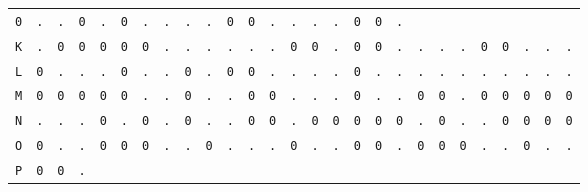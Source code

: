 \begin{figure}[H]
\begin{center}
{\begin{tabular}{c|cccccccccccccccccccccccccc}
				\texttt{0} & \texttt{.} & \texttt{.} & \texttt{0} &
				\texttt{.} & \texttt{0} & \texttt{.} & \texttt{.} &
				\texttt{.} & \texttt{.} & \texttt{0} & \texttt{0} &
				\texttt{.} & \texttt{.} & \texttt{.} & \texttt{.} &
				\texttt{0} & \texttt{0} & \texttt{.}                             \\
				\texttt{K} & \texttt{.} & \texttt{0} & \texttt{0} &
				\texttt{0} & \texttt{0} & \texttt{0} & \texttt{.} &
				\texttt{.} & \texttt{.} & \texttt{.} & \texttt{.} &
				\texttt{.} & \texttt{0} & \texttt{0} & \texttt{.} &
				\texttt{0} & \texttt{0} & \texttt{.} & \texttt{.} &
				\texttt{.} & \texttt{.} & \texttt{0} & \texttt{0} &
				\texttt{.} & \texttt{.} & \texttt{.}                             \\
				\texttt{L} & \texttt{0} & \texttt{.} & \texttt{.} &
				\texttt{.} & \texttt{0} & \texttt{.} & \texttt{.} &
				\texttt{0} & \texttt{.} & \texttt{0} & \texttt{0} &
				\texttt{.} & \texttt{.} & \texttt{.} & \texttt{.} &
				\texttt{0} & \texttt{.} & \texttt{.} & \texttt{.} &
				\texttt{.} & \texttt{.} & \texttt{.} & \texttt{.} &
				\texttt{.} & \texttt{.} & \texttt{.}                             \\
				\texttt{M} & \texttt{0} & \texttt{0} & \texttt{0} &
				\texttt{0} & \texttt{0} & \texttt{.} & \texttt{.} &
				\texttt{0} & \texttt{.} & \texttt{.} & \texttt{0} &
				\texttt{0} & \texttt{.} & \texttt{.} & \texttt{.} &
				\texttt{0} & \texttt{.} & \texttt{.} & \texttt{0} &
				\texttt{0} & \texttt{.} & \texttt{0} & \texttt{0} &
				\texttt{0} & \texttt{0} & \texttt{0}                             \\
				\texttt{N} & \texttt{.} & \texttt{.} & \texttt{.} &
				\texttt{0} & \texttt{.} & \texttt{0} & \texttt{.} &
				\texttt{0} & \texttt{.} & \texttt{.} & \texttt{0} &
				\texttt{0} & \texttt{.} & \texttt{0} & \texttt{0} &
				\texttt{0} & \texttt{0} & \texttt{0} & \texttt{.} &
				\texttt{0} & \texttt{.} & \texttt{.} & \texttt{0} &
				\texttt{0} & \texttt{0} & \texttt{0}                             \\
				\texttt{O} & \texttt{0} & \texttt{.} & \texttt{.} &
				\texttt{0} & \texttt{0} & \texttt{0} & \texttt{.} &
				\texttt{.} & \texttt{0} & \texttt{.} & \texttt{.} &
				\texttt{.} & \texttt{0} & \texttt{.} & \texttt{.} &
				\texttt{0} & \texttt{0} & \texttt{.} & \texttt{0} &
				\texttt{0} & \texttt{0} & \texttt{.} & \texttt{.} &
				\texttt{0} & \texttt{.} & \texttt{.}                             \\
				\texttt{P} & \texttt{0} & \texttt{0} & \texttt{.} &

\end{tabular}}
\end{center}
\end{figure}
